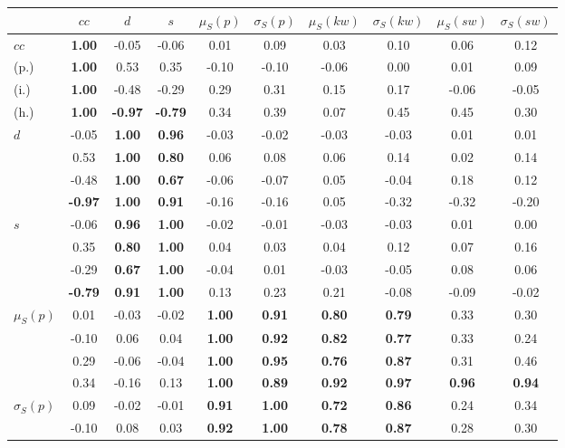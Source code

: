 \begin{table*}[h!]
\begin{center}
\begin{tabular}{| l || c | c | c | c | c | c | c | c | c |}\hline
 & $cc$ & $d$ & $s$ & $\mu_S(p)$ & $\sigma_S(p)$ & $\mu_S(kw)$ & $\sigma_S(kw)$ & $\mu_S(sw)$ & $\sigma_S(sw)$ \\\hline\hline
$cc$ & {\bf 1.00} & -0.05 & -0.06 & 0.01 & 0.09 & 0.03 & 0.10 & 0.06 & 0.12 \\
(p.) & {\bf 1.00} & 0.53 & 0.35 & -0.10 & -0.10 & -0.06 & 0.00 & 0.01 & 0.09 \\
(i.) & {\bf 1.00} & -0.48 & -0.29 & 0.29 & 0.31 & 0.15 & 0.17 & -0.06 & -0.05 \\
(h.) & {\bf 1.00} & {\bf -0.97} & {\bf -0.79} & 0.34 & 0.39 & 0.07 & 0.45 & 0.45 & 0.30 \\\hline
$d$ & -0.05 & {\bf 1.00} & {\bf 0.96} & -0.03 & -0.02 & -0.03 & -0.03 & 0.01 & 0.01 \\
 & 0.53 & {\bf 1.00} & {\bf 0.80} & 0.06 & 0.08 & 0.06 & 0.14 & 0.02 & 0.14 \\
 & -0.48 & {\bf 1.00} & {\bf 0.67} & -0.06 & -0.07 & 0.05 & -0.04 & 0.18 & 0.12 \\
 & {\bf -0.97} & {\bf 1.00} & {\bf 0.91} & -0.16 & -0.16 & 0.05 & -0.32 & -0.32 & -0.20 \\\hline
$s$ & -0.06 & {\bf 0.96} & {\bf 1.00} & -0.02 & -0.01 & -0.03 & -0.03 & 0.01 & 0.00 \\
 & 0.35 & {\bf 0.80} & {\bf 1.00} & 0.04 & 0.03 & 0.04 & 0.12 & 0.07 & 0.16 \\
 & -0.29 & {\bf 0.67} & {\bf 1.00} & -0.04 & 0.01 & -0.03 & -0.05 & 0.08 & 0.06 \\
 & {\bf -0.79} & {\bf 0.91} & {\bf 1.00} & 0.13 & 0.23 & 0.21 & -0.08 & -0.09 & -0.02 \\\hline
$\mu_S(p)$ & 0.01 & -0.03 & -0.02 & {\bf 1.00} & {\bf 0.91} & {\bf 0.80} & {\bf 0.79} & 0.33 & 0.30 \\
 & -0.10 & 0.06 & 0.04 & {\bf 1.00} & {\bf 0.92} & {\bf 0.82} & {\bf 0.77} & 0.33 & 0.24 \\
 & 0.29 & -0.06 & -0.04 & {\bf 1.00} & {\bf 0.95} & {\bf 0.76} & {\bf 0.87} & 0.31 & 0.46 \\
 & 0.34 & -0.16 & 0.13 & {\bf 1.00} & {\bf 0.89} & {\bf 0.92} & {\bf 0.97} & {\bf 0.96} & {\bf 0.94} \\\hline
$\sigma_S(p)$ & 0.09 & -0.02 & -0.01 & {\bf 0.91} & {\bf 1.00} & {\bf 0.72} & {\bf 0.86} & 0.24 & 0.34 \\
 & -0.10 & 0.08 & 0.03 & {\bf 0.92} & {\bf 1.00} & {\bf 0.78} & {\bf 0.87} & 0.28 & 0.30 \\

\end{tabular}
\end{center}
\end{table*}
